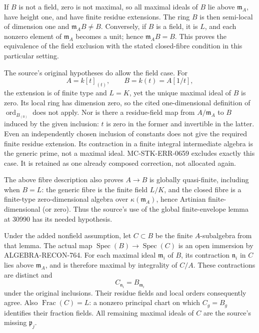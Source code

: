 If \(B\) is not a field, zero is not maximal, so all maximal ideals of \(B\) lie above \(\mathfrak m_A\), have height one, and have finite residue extensions. The ring \(B\) is then semi-local of dimension one and \(\mathfrak m_A B\ne B\). Conversely, if \(B\) is a field, it is \(L\), and each nonzero element of \(\mathfrak m_A\) becomes a unit; hence \(\mathfrak m_A B=B\). This proves the equivalence of the field exclusion with the stated closed-fibre condition in this particular setting.

The source's original hypotheses do allow the field case. For \[
 A=k[t]_{(t)},\qquad B=k(t)=A[1/t],
\] the extension is of finite type and \(L=K\), yet the unique maximal ideal of \(B\) is zero. Its local ring has dimension zero, so the cited one-dimensional definition of \(\operatorname{ord}_{B_{(0)}}\) does not apply. Nor is there a residue-field map from \(A/\mathfrak m_A\) to \(B\) induced by the given inclusion: \(t\) is zero in the former and invertible in the latter. Even an independently chosen inclusion of constants does not give the required finite residue extension. Its contraction in a finite integral intermediate algebra is the generic prime, not a maximal ideal. MC-\AlgebraIdentifierBreak{}STK-\AlgebraIdentifierBreak{}ERR-\AlgebraIdentifierBreak{}0659 excludes exactly this case. It is retained as one already composed correction, not allocated again.

The above fibre description also proves \(A\to B\) is globally quasi-finite, including when \(B=L\): the generic fibre is the finite field \(L/K\), and the closed fibre is a finite-type zero-dimensional algebra over \(\kappa(\mathfrak m_A)\), hence Artinian finite-dimensional (or zero). Thus the source's use of the global finite-envelope lemma at 30990 has its needed hypothesis.

Under the added nonfield assumption, let \(C\subset B\) be the finite \(A\)-subalgebra from that lemma. The actual map \(\operatorname{Spec}(B)\to\operatorname{Spec}(C)\) is an open immersion by ALGEBRA-\AlgebraIdentifierBreak{}RECON-\AlgebraIdentifierBreak{}764. For each maximal ideal \(\mathfrak m_i\) of \(B\), its contraction \(\mathfrak n_i\) in \(C\) lies above \(\mathfrak m_A\), and is therefore maximal by integrality of \(C/A\). These contractions are distinct and \[
 C_{\mathfrak n_i}=B_{\mathfrak m_i}
\] under the original inclusions. Their residue fields and local orders consequently agree. Also \(\operatorname{Frac}(C)=L\): a nonzero principal chart on which \(C_g=B_g\) identifies their fraction fields. All remaining maximal ideals of \(C\) are the source's missing \(\mathfrak p_j\).

